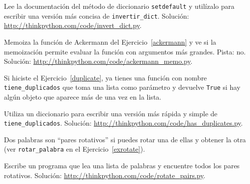 \documentclass[10pt]{book}
\begin{document}
\begin{exercise}
\label{setdefault}

Lee la documentación del método de diccionario {\tt setdefault}
y utilízalo para escribir una versión más concisa de \verb"invertir_dict".
Solución: \url{http://thinkpython.com/code/invert_dict.py}.

\end{exercise}


\begin{exercise}
Memoiza la función de Ackermann del Ejercicio~\ref{ackermann} y ve si
la memoización permite evaluar la función con argumentos
más grandes.  Pista: no.
Solución: \url{http://thinkpython.com/code/ackermann_memo.py}.

\end{exercise}



\begin{exercise}

Si hiciste el Ejercicio~\ref{duplicate}, ya tienes
una función con nombre \verb"tiene_duplicados" que toma una lista
como parámetro y devuelve {\tt True} si hay algún objeto
que aparece más de una vez en la lista.

Utiliza un diccionario para escribir una versión más rápida y simple de
\verb"tiene_duplicados".
Solución: \url{http://thinkpython.com/code/has_duplicates.py}.

\end{exercise}


\begin{exercise}
\label{exrotatepairs}

Dos palabras son ``pares rotativos'' si puedes rotar una de ellas
y obtener la otra (ver \verb"rotar_palabra" en el Ejercicio~\ref{exrotate}).

Escribe un programa que lea una lista de palabras y encuentre todos los pares
rotativos.  Solución: \url{http://thinkpython.com/code/rotate_pairs.py}.

\end{exercise}
\end{document}
